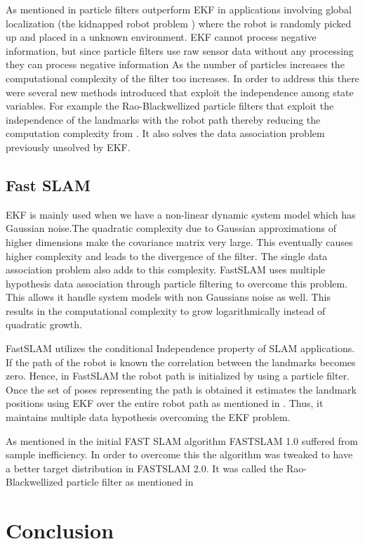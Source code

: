 \documentclass[conference]{IEEEtran}
\begin{document}
As mentioned in \cite{Thrun2002a} particle filters outperform EKF in applications involving global localization (the kidnapped robot problem ) where the robot is randomly picked up and placed in a unknown environment. 
EKF cannot process negative information, but since particle filters use raw sensor data without any processing they can process negative information\cite{Thrun2002a}
As the number of particles increases the computational complexity of the filter too increases. In order to address this there were several new methods introduced that  exploit the independence among state variables. For example the Rao-Blackwellized particle filters that exploit the independence of the landmarks with the robot path thereby reducing the computation complexity from \cite{Yuan2012}. It also solves the data association problem previously unsolved by EKF.
	

	
	\subsection{Fast SLAM}
	EKF is mainly used when we have a non-linear dynamic system model which has Gaussian noise.The quadratic complexity due to Gaussian approximations of higher dimensions make the covariance matrix very large. This eventually causes higher complexity and leads to the divergence of the filter. The single data association problem also adds to this complexity. FastSLAM uses multiple hypothesis data association through particle filtering to overcome this problem. This allows it handle system models with non Gaussians noise as well. This results in the computational complexity to grow logarithmically instead of quadratic growth.
	
	FastSLAM utilizes the conditional Independence property of SLAM applications. If the path of the robot is known the correlation between the landmarks becomes zero. Hence, in FastSLAM the robot path is initialized by using a particle filter. Once the set of poses representing the path is obtained it estimates the landmark positions using EKF over the entire robot path as mentioned in \cite{Yuan2012}. Thus, it maintains multiple data hypothesis overcoming the EKF problem.
	
	As mentioned in \cite{Thrun2002a} the initial FAST SLAM algorithm  FASTSLAM 1.0  suffered from sample inefficiency. In order to overcome this the algorithm was tweaked to have a better target distribution in FASTSLAM 2.0. It was called the Rao-Blackwellized particle filter as mentioned in \cite{Montemerlo2003}

	
	
	
	
	
	
	
	
	
	
	
	
	
	
	
	
	\section{Conclusion}
	
	
	
	
	
	
	
	
	
	
	
\end{document}
